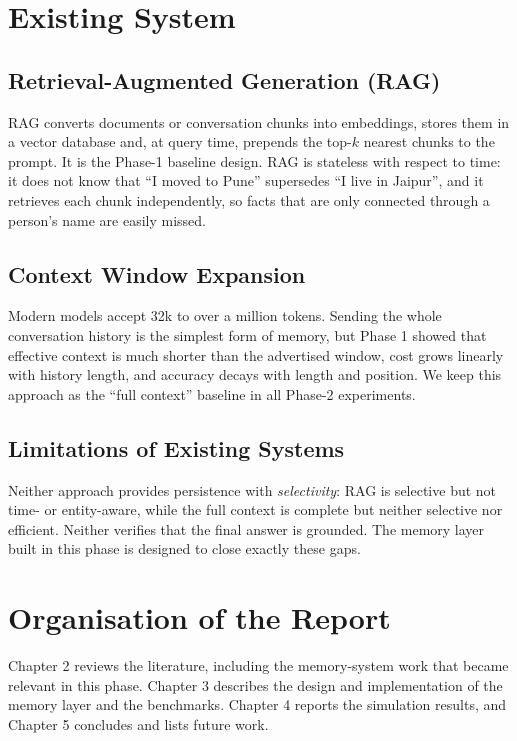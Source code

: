 \section{Existing System}
\subsection{Retrieval-Augmented Generation (RAG)}
RAG converts documents or conversation chunks into embeddings, stores them in a vector database and, at
query time, prepends the top-$k$ nearest chunks to the prompt. It is the Phase-1 baseline design. RAG is
stateless with respect to time: it does not know that ``I moved to Pune'' supersedes ``I live in Jaipur'',
and it retrieves each chunk independently, so facts that are only connected through a person's name are
easily missed.

\subsection{Context Window Expansion}
Modern models accept 32k to over a million tokens. Sending the whole conversation history is the simplest
form of memory, but Phase 1 showed that effective context is much shorter than the advertised window, cost
grows linearly with history length, and accuracy decays with length and position. We keep this approach as
the ``full context'' baseline in all Phase-2 experiments.

\subsection{Limitations of Existing Systems}
Neither approach provides persistence with \emph{selectivity}: RAG is selective but not time- or
entity-aware, while the full context is complete but neither selective nor efficient. Neither verifies that
the final answer is grounded. The memory layer built in this phase is designed to close exactly these gaps.

\section{Organisation of the Report}
Chapter 2 reviews the literature, including the memory-system work that became relevant in this phase.
Chapter 3 describes the design and implementation of the memory layer and the benchmarks. Chapter 4 reports
the simulation results, and Chapter 5 concludes and lists future work.
